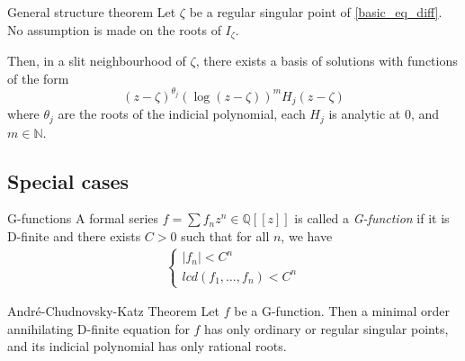 \documentclass[../main.tex]{subfiles}
\begin{document}
\begin{thm}{General structure theorem}
	Let $\zeta$ be a regular singular point of \eqref{basic_eq_diff}. No assumption is made on the roots of $I_\zeta$.
	
	Then, in a slit neighbourhood of $\zeta$, there exists a basis of solutions with functions of the form
	\begin{equation}\label{general_structure_form}
	{(z - \zeta)}^{\theta_j} {(\log (z - \zeta))}^m H_j (z - \zeta)
	\end{equation}
	where $\theta_j$ are the roots of the indicial polynomial, each $H_j$ is analytic at 0, and $m \in \mathbb{N}$. 
\end{thm}

\subsection{Special cases}

\begin{definition}{G-functions}
	A formal series $f = \sum f_n z^n \in \mathbb{Q}[[z]]$ is called a \emph{G-function} if it is D-finite and there exists $C > 0$ such that for all $n$, we have
	\begin{align*}
	\begin{cases}
	|f_n| < C^n\\
	lcd(f_1, \dots, f_n) < C^n
	\end{cases}
	\end{align*}	
\end{definition}

\begin{thm}{André-Chudnovsky-Katz Theorem}
	Let $f$ be a G-function. Then a minimal order annihilating D-finite equation for $f$ has only ordinary or regular singular points, and its indicial polynomial has only rational roots.
\end{thm}



\end{document}

